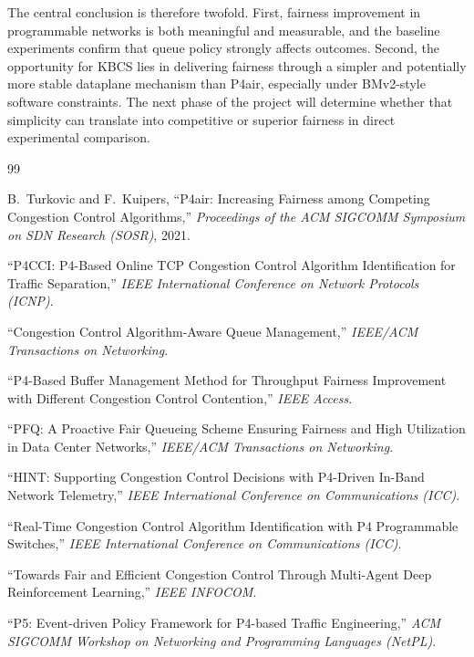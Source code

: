 \documentclass[12pt,a4paper]{report}
\begin{document}
The central conclusion is therefore twofold. First, fairness improvement in programmable networks is both meaningful and measurable, and the baseline experiments confirm that queue policy strongly affects outcomes. Second, the opportunity for KBCS lies in delivering fairness through a simpler and potentially more stable dataplane mechanism than P4air, especially under BMv2-style software constraints. The next phase of the project will determine whether that simplicity can translate into competitive or superior fairness in direct experimental comparison.

\renewcommand{\bibname}{References}
\begin{thebibliography}{99}

B.~Turkovic and F.~Kuipers,
``P4air: Increasing Fairness among Competing Congestion Control Algorithms,''
\textit{Proceedings of the ACM SIGCOMM Symposium on SDN Research (SOSR)}, 2021.

``P4CCI: P4-Based Online TCP Congestion Control Algorithm Identification for Traffic Separation,''
\textit{IEEE International Conference on Network Protocols (ICNP)}.

``Congestion Control Algorithm-Aware Queue Management,''
\textit{IEEE/ACM Transactions on Networking}.

``P4-Based Buffer Management Method for Throughput Fairness Improvement with Different Congestion Control Contention,''
\textit{IEEE Access}.

``PFQ: A Proactive Fair Queueing Scheme Ensuring Fairness and High Utilization in Data Center Networks,''
\textit{IEEE/ACM Transactions on Networking}.

``HINT: Supporting Congestion Control Decisions with P4-Driven In-Band Network Telemetry,''
\textit{IEEE International Conference on Communications (ICC)}.

``Real-Time Congestion Control Algorithm Identification with P4 Programmable Switches,''
\textit{IEEE International Conference on Communications (ICC)}.

``Towards Fair and Efficient Congestion Control Through Multi-Agent Deep Reinforcement Learning,''
\textit{IEEE INFOCOM}.

``P5: Event-driven Policy Framework for P4-based Traffic Engineering,''
\textit{ACM SIGCOMM Workshop on Networking and Programming Languages (NetPL)}.


\end{thebibliography}
\end{document}
